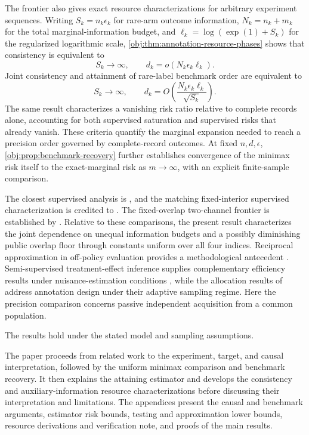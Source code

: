 The frontier also gives exact resource characterizations for arbitrary experiment sequences. Writing \(S_k=n_k\epsilon_k\) for rare-arm outcome information, \(N_k=n_k+m_k\) for the total marginal-information budget, and \(\ell_k=\log(\exp(1)+S_k)\) for the regularized logarithmic scale, \cref{obj:thm:annotation-resource-phases} shows that consistency is equivalent to
\[
S_k\longrightarrow\infty,
\qquad
d_k=o(N_k\epsilon_k\ell_k).
\]
Joint consistency and attainment of rare-label benchmark order are equivalent to
\[
S_k\longrightarrow\infty,
\qquad
d_k=O\!\left(\frac{N_k\epsilon_k\ell_k}{\sqrt{S_k}}\right).
\]
The same result characterizes a vanishing risk ratio relative to complete records alone, accounting for both supervised saturation and supervised risks that already vanish. These criteria quantify the marginal expansion needed to reach a precision order governed by complete-record outcomes. At fixed \(n,d,\epsilon\), \cref{obj:prop:benchmark-recovery} further establishes convergence of the minimax risk itself to the exact-marginal risk as \(m\to\infty\), with an explicit finite-sample comparison.

The closest supervised analysis is \citet[model (3), Theorems 1--2]{ZengBalakrishnanHanKennedy2026Discrete}, and the matching fixed-interior supervised characterization is credited to \citet[Theorem \texttt{thm:sharp-minimax-fixed-interior}]{InternalDiscreteATEPolynomialUpperMatch}. The fixed-overlap two-channel frontier is established by \citet[Theorem 4]{CausalSmith2026Annotation}. Relative to these comparisons, the present result characterizes the joint dependence on unequal information budgets and a possibly diminishing public overlap floor through constants uniform over all four indices. Reciprocal approximation in off-policy evaluation provides a methodological antecedent \citep[Section 3.3, Theorems 5--6]{MaZhuJiaoWainwright2022OPE}. Semi-supervised treatment-effect inference supplies complementary efficiency results under nuisance-estimation conditions \citep[Theorem 2.1 and Corollary 2.1]{ChakraborttyDai2024Semisupervised}, while the allocation results of \citet[Theorems 4.2 and 5.1 of the arXiv manuscript]{NwankwoGoldkindZhou2026Annotations} address annotation design under their adaptive sampling regime. Here the precision comparison concerns passive independent acquisition from a common population.

The results hold under the stated model and sampling assumptions.

The paper proceeds from related work to the experiment, target, and causal interpretation, followed by the uniform minimax comparison and benchmark recovery. It then explains the attaining estimator and develops the consistency and auxiliary-information resource characterizations before discussing their interpretation and limitations. The appendices present the causal and benchmark arguments, estimator risk bounds, testing and approximation lower bounds, resource derivations and verification note, and proofs of the main results.
